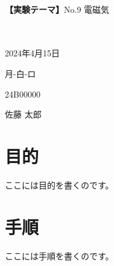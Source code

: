 \documentclass[a4paper]{ltjsreport}
\begin{document}
\begin{multicols}{2}
\vspace*{5px}
\\
{\large \textbf{【実験テーマ】}No.9 電磁気}\\
\\
\\
\begin{description}[labelwidth=6.0em]
  \setlength{\leftskip}{3.8cm}
  \item[実験日] 2024年4月15日
  \item[曜日-組-班] 月-白-ロ
  \item[学籍番号] 24B00000
  \item[名前] 佐藤 太郎
\end{description}
\end{multicols}

\section*{目的}
ここには目的を書くのです。
\section*{手順}
ここには手順を書くのです。
\end{document}

